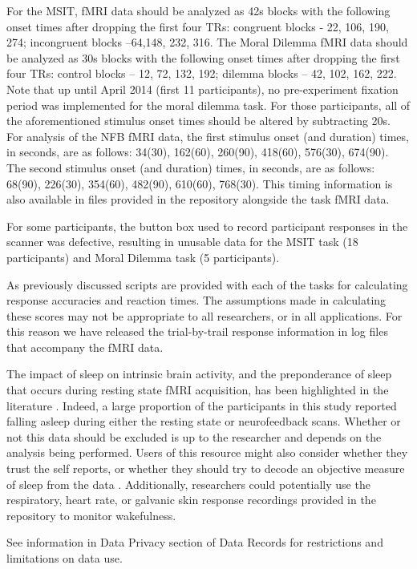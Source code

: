 For the MSIT, fMRI data should be analyzed as 42s blocks with the following onset times after dropping the first four TRs: congruent blocks - 22, 106, 190, 274; incongruent blocks –64,148, 232, 316. The Moral Dilemma fMRI data should be analyzed as 30s blocks with the following onset times after dropping the first four TRs: control blocks – 12, 72, 132, 192; dilemma blocks – 42, 102, 162, 222. Note that up until April 2014 (first 11 participants), no pre-experiment fixation period was implemented for the moral dilemma task. For those participants, all of the aforementioned stimulus onset times should be altered by subtracting 20s. For analysis of the NFB fMRI data, the first stimulus onset (and duration) times, in seconds, are as follows: 34(30), 162(60), 260(90), 418(60), 576(30), 674(90). The second stimulus onset (and duration) times, in seconds, are as follows: 68(90), 226(30), 354(60), 482(90), 610(60), 768(30). This timing information is also available in  files provided in the repository alongside the task fMRI data.

For some participants, the button box used to record participant responses in the scanner was defective, resulting in unusable data for the MSIT task (18 participants) and Moral Dilemma task (5 participants).

As previously discussed scripts are provided with each of the tasks for calculating response accuracies and reaction times. The assumptions made in calculating these scores may not be appropriate to all researchers, or in all applications. For this reason we have released the trial-by-trail response information in log files that accompany the fMRI data.

The  impact of sleep on intrinsic brain activity, and the preponderance of sleep that occurs during resting state fMRI acquisition, has been highlighted in the literature \cite{Duyn2011,Tagliazucchi2014}. Indeed, a large proportion of the participants in this study reported falling asleep during either the resting state or neurofeedback scans. Whether or not this data should be excluded is up to the researcher and depends on the analysis being performed. Users of this resource might also consider whether they trust the self reports, or whether they should try to decode an objective measure of sleep from the data \cite{Tagliazucchi2014}. Additionally, researchers could potentially use the respiratory, heart rate, or galvanic skin response recordings provided in the repository to monitor wakefulness.

See information in Data Privacy section of Data Records for restrictions and limitations on data use.

